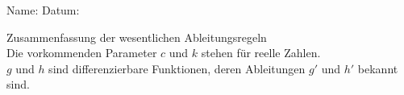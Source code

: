 \documentclass[a4paper,12pt]{article}
\author{\Name{}}
\newcommand{\Fach}{aus der Mathematik (A)}
\newcommand{\Name}{}
\newcommand{\datum}{}
\newcommand{\Matrikelnummer}{}
\newcommand{\Semester}{Q12/1}
\newcommand{\Uebungsblatt}{} %
\begin{document}


  Name: \underline{\hspace{7cm}}
  \hfill
  Datum: \underline{\hspace{4cm}}

\vspace{2cm}



{\LARGE Zusammenfassung der wesentlichen Ableitungsregeln}
\\

Die vorkommenden Parameter $c$ und $k$ stehen für reelle Zahlen.\\
$g$ und $h$ sind differenzierbare Funktionen, deren Ableitungen $g'$ und $h'$ bekannt sind.\\
\end{document}

